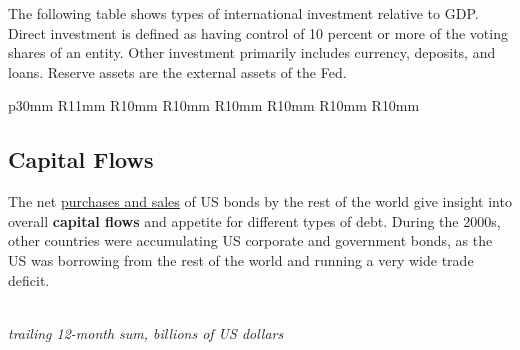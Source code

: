 \begin{minipage}{0.76\textwidth}
\small The following table shows types of international investment relative to GDP. Direct investment is defined as having control of 10 percent or more of the voting shares of an entity. Other investment primarily includes currency, deposits, and loans. Reserve assets are the external assets of the Fed.

\vspace*{-4mm}

 \setlength{\tabcolsep}{3.5pt} \color{black!90}
		{\renewcommand{\arraystretch}{1.55}
\hspace*{-0.5mm} \begin{tabular}{p{30mm} R{11mm} R{10mm} R{10mm} R{10mm} 
			R{10mm} R{10mm} R{10mm}}
			  \hline
		\end{tabular}}
\vspace{-1.5mm}	
	
\end{minipage}
\newpage
\hypertarget{excf}{\label{excf}}
\subsection*{Capital Flows}
\begin{minipage}{0.76\textwidth}
\vspace{-0.5mm}
\small The net \href{https://home.treasury.gov/data/treasury-international-capital-tic-system}{purchases and sales} of US bonds by the rest of the world give insight into overall \textbf{capital flows} and appetite for different types of debt. During the 2000s, other countries were accumulating US corporate and government bonds, as the US was borrowing from the rest of the world and running a very wide trade deficit. 


\vspace{1mm}

\\\footnotesize{\textit{trailing 12-month sum, billions of US dollars}}\\
\end{minipage}
\newpage
\hypertarget{extfx}{\label{extfx}}
